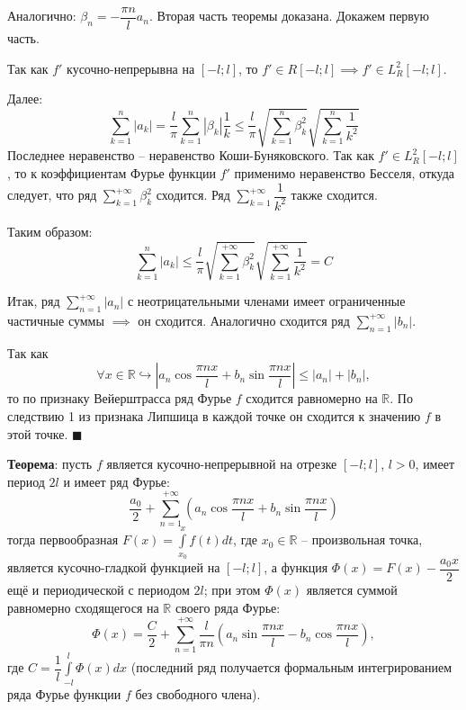 \documentclass[12pt, a4paper, reqno]{article}
\begin{document}
    Аналогично: $\beta_n = -\dfrac{\pi n}{l}a_n$. Вторая часть теоремы доказана. Докажем первую часть.

    Так как $f'$ кусочно-непрерывна на $[-l; l]$, то $f' \in R[-l; l] \implies f' \in L_R^2[-l; l]$.

    Далее:
    \begin{equation*}
        \sum\limits_{k = 1}^{n} |a_k| = \frac{l}{\pi} \sum\limits_{k = 1}^{n} |\beta_k|\frac{1}{k} \leq
        \frac{l}{\pi} \sqrt{\sum\limits_{k = 1}^{n} \beta_k^2} \sqrt{\sum\limits_{k = 1}^{n} \frac{1}{k^2}}
    \end{equation*}
    Последнее неравенство -- неравенство Коши-Буняковского. Так как $f' \in L_R^2[-l; l]$, то к
    коэффициентам Фурье функции $f'$ применимо неравенство Бесселя, откуда следует, что ряд
    $\sum\limits_{k = 1}^{+\infty} \beta_k^2$ сходится. Ряд $\sum\limits_{k = 1}^{+\infty} \dfrac{1}{k^2}$
    также сходится.

    Таким образом:
    \begin{equation*}
        \sum\limits_{k = 1}^{n} |a_k| \leq \frac{l}{\pi} \sqrt{\sum\limits_{k = 1}^{+\infty} \beta_k^2}
        \sqrt{\sum\limits_{k = 1}^{+\infty} \frac{1}{k^2}} = C
    \end{equation*}

    Итак, ряд $\sum\limits_{n = 1}^{+\infty} |a_n|$ с неотрицательными членами имеет ограниченные
    частичные суммы $\implies$ он сходится. Аналогично сходится ряд $\sum\limits_{n = 1}^{+\infty} |b_n|$.

    Так как
    \begin{equation*}
        \forall x \in \mathbb{R} \hookrightarrow
        \left|a_n \cos{\frac{\pi nx}{l}} + b_n \sin{\frac{\pi nx}{l}}\right| \leq
        |a_n| + |b_n|,
    \end{equation*}
    то по признаку Вейерштрасса ряд Фурье $f$ сходится равномерно на $\mathbb{R}$. По следствию 1 из
    признака Липшица в каждой точке он сходится к значению $f$ в этой точке.
    $\blacksquare$

    \textbf{Теорема}: пусть $f$ является кусочно-непрерывной на отрезке $[-l; l]$, $l > 0$, имеет
    период $2l$ и имеет ряд Фурье:
    \begin{equation*}
        \frac{a_0}{2} + \sum\limits_{n = 1}^{+\infty}
        \left(
            a_n \cos{\frac{\pi nx}{l}} + b_n \sin{\frac{\pi nx}{l}}
        \right)
    \end{equation*}
    тогда первообразная $F(x) = \int\limits_{x_0}^{x} f(t)dt$, где $x_0 \in \mathbb{R}$ -- произвольная
    точка, является кусочно-гладкой функцией на $[-l; l]$, а функция $\Phi(x) = F(x) - \dfrac{a_0 x}{2}$
    ещё и периодической с периодом $2l$; при этом $\Phi(x)$ является суммой равномерно сходящегося
    на $\mathbb{R}$ своего ряда Фурье:
    \begin{equation*}
        \Phi(x) = \frac{C}{2} + \sum\limits_{n = 1}^{+\infty} \frac{l}{\pi n}
        \left(
            a_n \sin{\frac{\pi nx}{l}} - b_n \cos{\frac{\pi nx}{l}}
        \right),
    \end{equation*}
    где $C = \dfrac{1}{l}\int\limits_{-l}^{l} \Phi(x)dx$ (последний ряд получается формальным
    интегрированием ряда Фурье функции $f$ без свободного члена).
\end{document}
